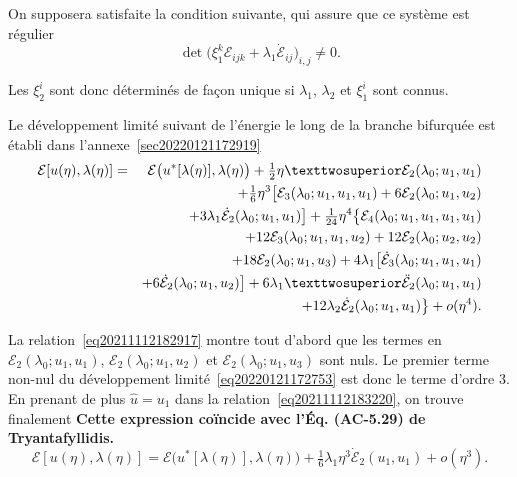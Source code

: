 \documentclass[12pt, final]{amsart}
\begin{document}
On supposera satisfaite la condition suivante, qui assure que ce système est régulier
\begin{equation}
  \det\bigl(\xi _1^k\mathcal E_{ijk}+\lambda _1\dot{\mathcal E}_{ij}\bigr)_{i,j}\neq0.
\end{equation}

Les \(\xi _2^i\) sont donc déterminés de façon unique si \(\lambda _1\), \(\lambda _2\) et \(\xi _1^i\)
sont connus.

Le développement limité suivant de l'énergie le long de la branche bifurquée
est établi dans l'annexe~\ref{sec20220121172919}
\begin{eqnarray}
  \notag
  \mathcal E[u(\eta ), \lambda (\eta )]
  &=&\mathcal E\bigl(u^*[\lambda (\eta )], \lambda (\eta )\bigr)+\tfrac12\eta ²\mathcal E_2(\lambda _0; u_1, u_1)\\
  \notag
  &&+\tfrac16\eta ^3\bigl[\mathcal E_3(\lambda _0;u_1, u_1, u_1)+6\mathcal E_2(\lambda _0; u_1, u_2)\\
  \notag
  &&+3\lambda _1\dot{\mathcal E}_2(\lambda _0; u_1, u_1)\bigr]+\tfrac1{24}\eta ^4\bigl\{\mathcal E_4(\lambda _0;u_1, u_1, u_1, u_1)\\
  \notag
  &&+12\mathcal E_3(\lambda _0; u_1, u_1, u_2)+12\mathcal E_2(\lambda _0; u_2, u_2)\\
  \notag
  &&+18\mathcal E_2(\lambda _0; u_1, u_3)+4\lambda _1\bigl[\dot{\mathcal E}_3(\lambda _0; u_1, u_1, u_1)\\
  \notag
  &&+6\dot{\mathcal E}_2(\lambda _0; u_1, u_2)\bigr]+6\lambda _1²\ddot{\mathcal E}_2(\lambda _0; u_1, u_1)\\
  \label{eq20220121172753}
  &&+12\lambda _2\dot{\mathcal E}_2(\lambda _0; u_1, u_1)\bigr\}+o(\eta ^4).
\end{eqnarray}

La relation~\eqref{eq20211112182917} montre tout d'abord que les termes en
\(\mathcal E_2(\lambda _0; u_1, u_1)\), \(\mathcal E_2(\lambda _0; u_1, u_2)\) et \(\mathcal E_2(\lambda _0; u_1, u_3)\) sont nuls. Le
premier terme non-nul du développement limité~\eqref{eq20220121172753} est
donc le terme d'ordre 3. En prenant de plus \(\hat{u}=u_1\) dans la
relation~\eqref{eq20211112183220}, on trouve finalement \textbf{Cette
  expression coïncide avec l'Éq. (AC-5.29) de Tryantafyllidis.}
\begin{equation}
  \mathcal E[u(\eta ), \lambda (\eta )]=\mathcal E\bigl(u^*[\lambda (\eta )], \lambda (\eta )\bigr)+\tfrac16\lambda _1\eta ^3\dot{\mathcal E}_2(u_1, u_1)+o(\eta ^3).
\end{equation}
\end{document}
